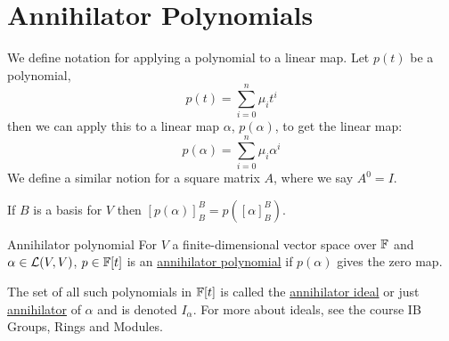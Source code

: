 \documentclass[../Main.tex]{subfiles}
\begin{document}
\section{Annihilator Polynomials}
We define notation for applying a polynomial to a linear map. Let $p(t)$ be a polynomial,
\begin{equation*}
    p(t) = \sum_{i=0}^{n}\mu_i t^i
\end{equation*}
then we can apply this to a linear map $\alpha$, $p(\alpha)$, to get the linear map:
\begin{equation*}
    p(\alpha) = \sum_{i=0}^{n} \mu_i \alpha^i
\end{equation*}
We define a similar notion for a square matrix $A$, where we say $A^0 = I$.
\begin{remark}
    If $B$ is a basis for $V$ then $[p(\alpha)]_B^B = p([\alpha]_B^B)$.
\end{remark}
\begin{definition}{Annihilator polynomial}
    For $V$ a finite-dimensional vector space over $\mathbb{F}$ and $\alpha \in \mathcal{L}(V, V)$, $p \in \mathbb{F}[t]$ is an \underline{annihilator polynomial} if $p(\alpha)$ gives the zero map.
\end{definition}
The set of all such polynomials in $\mathbb{F}[t]$ is called the \underline{annihilator ideal} or just \underline{annihilator} of $\alpha$ and is denoted $I_\alpha$. For more about ideals, see the course IB Groups, Rings and Modules.
\end{document}
